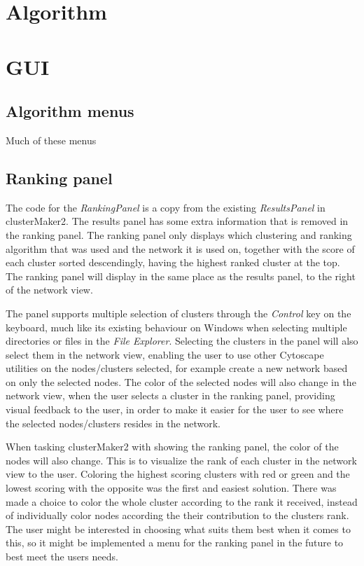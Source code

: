 \section{Algorithm}
\section{GUI}
\subsection{Algorithm menus}
Much of these menus
\subsection{Ranking panel}
The code for the \textit{RankingPanel} is a copy from the existing
\textit{ResultsPanel} in clusterMaker2. The results panel has some extra
information that is removed in the ranking panel. The ranking panel only
displays which clustering and ranking algorithm that was used and the network it
is used on, together with the score of each cluster sorted descendingly, having
the highest ranked cluster at the top. The ranking panel will display in the
same place as the results panel, to the right of the network view.

The panel supports multiple selection of clusters through the \textit{Control}
key on the keyboard, much like its existing behaviour on Windows when selecting
multiple directories or files in the \textit{File Explorer}. Selecting the
clusters in the panel will also select them in the network view, enabling the
user to use other Cytoscape utilities on the nodes/clusters selected, for
example create a new network based on only the selected nodes. The color of the
selected nodes will also change in the network view, when the user selects a
cluster in the ranking panel, providing visual feedback to the user, in order to
make it easier for the user to see where the selected nodes/clusters resides in
the network.

When tasking clusterMaker2 with showing the ranking panel, the color of the
nodes will also change. This is to visualize the rank of each cluster in the
network view to the user. Coloring the highest scoring clusters with red or
green and the lowest scoring with the opposite was the first and easiest
solution. There was made a choice to color the whole cluster according to the
rank it received, instead of individually color nodes according the their
contribution to the clusters rank. The user might be interested in choosing what
suits them best when it comes to this, so it might be implemented a menu for the
ranking panel in the future to best meet the users needs.

